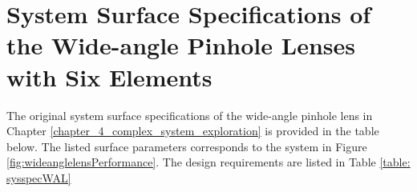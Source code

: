\newpage
\section{System Surface Specifications of the Wide-angle Pinhole Lenses with Six Elements} 
\label{apdx: wide-angle-specs_6_elements}

The original system surface specifications of the wide-angle pinhole lens in Chapter \ref{chapter_4_complex_system_exploration} is provided in the table below. The listed surface parameters corresponds to the system in Figure \ref{fig:wideanglelensPerformance}. The design requirements are listed in Table \ref{table: sysspecWAL}

\setlength{\arrayrulewidth}{.5mm}
\setlength{\tabcolsep}{18pt}
\renewcommand{\arraystretch}{1.2}
